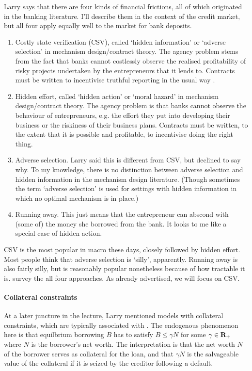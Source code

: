 \documentclass[11pt,letterpaper,reqno,oneside]{article}
\begin{document}
Larry says that there are four kinds of financial frictions, all of which originated in the banking literature. I'll describe them in the context of the credit market, but all four apply equally well to the market for bank deposits.
%
\begin{enumerate}
	
	\item Costly state verification (CSV), called `hidden information' or `adverse selection' in mechanism design/contract theory. The agency problem stems from the fact that banks cannot costlessly observe the realised profitability of risky projects undertaken by the entrepreneurs that it lends to. Contracts must be written to incentivise truthful reporting in the usual way \parencite{Myerson1981}.

	\item Hidden effort, called `hidden action' or `moral hazard' in mechanism design/contract theory. The agency problem is that banks cannot observe the behaviour of entrepreneurs, e.g. the effort they put into developing their business or the riskiness of their business plans. Contracts must be written, to the extent that it is possible and profitable, to incentivise doing the right thing.

	\item Adverse selection. Larry said this is different from CSV, but declined to say why. To my knowledge, there is no distinction between adverse selection and hidden information in the mechanism design literature. (Though sometimes the term `adverse selection' is used for settings with hidden information in which no optimal mechanism is in place.)

	\item Running away. This just means that the entrepreneur can abscond with (some of) the money she borrowed from the bank. It looks to me like a special case of hidden action.
	
\end{enumerate}
%
CSV is the most popular in macro these days, closely followed by hidden effort. Most people think that adverse selection is `silly', apparently. Running away is also fairly silly, but is reasonably popular nonetheless because of how tractable it is. \textcite{ChristianoIkeda2013} survey the all four approaches. As already advertised, we will focus on CSV.


\paragraph{Collateral constraints} At a later juncture in the lecture, Larry mentioned models with collateral constraints, which are typically associated with \textcite{KiyotakiMoore1997}. The endogenous phenomenon here is that equilbrium borrowing $B$ has to satisfy $B \leq \gamma N$ for some $\gamma \in \mathbf{R}_+$ where $N$ is the borrower's net worth. The interpretation is that the net worth $N$ of the borrower serves as collateral for the loan, and that $\gamma N$ is the salvageable value of the collateral if it is seized by the creditor following a default.
\end{document}
